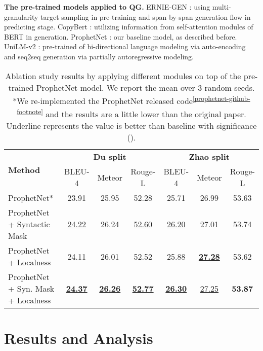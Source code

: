 \documentclass[11pt]{article}
\begin{document}
\textbf{The pre-trained models applied to QG.} ERNIE-GEN \citep{ijcai2020-553}: using multi-granularity target sampling in pre-training and span-by-span generation flow in predicting stage. CopyBert \citep{varanasi-etal-2020-copybert}: utilizing information from self-attention modules of BERT in generation. ProphetNet \citep{qi-etal-2020-prophetnet}: our baseline model, as described before. UniLM-v2 \citep{bao2020unilmv2}: pre-trained of bi-directional language modeling via auto-encoding and seq2seq generation via partially autoregressive modeling.

\begin{table*}[t]
\centering
\small
\begin{tabular}{@{}l|cccccc@{}}
\toprule[1pt]
\multicolumn{1}{l|}{\multirow{2}{*}{\textbf{Method}}} & \multicolumn{3}{c|}{\textbf{Du split}}               & \multicolumn{3}{c}{\textbf{Zhao split}} \\
\multicolumn{1}{c|}{}        & BLEU-4 & Meteor & \multicolumn{1}{c|}{Rouge-L} & BLEU-4 & Meteor & Rouge-L \\ \midrule

ProphetNet*                  & 23.91  & 25.95  & \multicolumn{1}{c|}{52.28}   & 25.71  & 26.99  & 53.63   \\
ProphetNet + Syntactic Mask & \underline{24.22}  & 26.24  & \multicolumn{1}{c|}{\underline{52.60}}   & \underline{26.20}  & 27.01  & 53.74   \\
ProphetNet + Localness      & 24.11  & 26.01  & \multicolumn{1}{c|}{52.52}   & 25.88  & \underline{\textbf{27.28}}  & 53.62   \\
ProphetNet + Syn. Mask + Localness          & \underline{\textbf{24.37}} & \underline{\textbf{26.26}} & \multicolumn{1}{c|}{\underline{\textbf{52.77}}} & \underline{\textbf{26.30}} & \underline{27.25}    & \textbf{53.87} 
\\ \bottomrule[1pt]
\end{tabular}
\caption{Ablation study results by applying different modules on top of the pre-trained ProphetNet model. We report the mean over 3 random seeds. *We re-implemented the ProphetNet released code\textsuperscript{\ref{prophetnet-github-footnote}} and the results are a little lower than the original paper. Underline represents the value is better than baseline with significance ().}
\label{ablation-table}
\end{table*}

\section{Results and Analysis}
\end{document}
